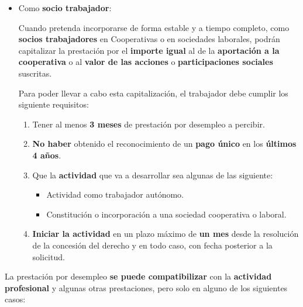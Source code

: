 \begin{enumerate}
\begin{itemize}
        \item Como \textbf{socio trabajador}:

        Cuando pretenda incorporarse de forma estable y a tiempo completo, como \textbf{socios trabajadores} en Cooperativas o en sociedades laborales, podrán capitalizar la prestación por el \textbf{importe igual} al de la \textbf{aportación a la cooperativa} o al \textbf{valor de las acciones} o \textbf{participaciones sociales} suscritas.

        Para poder llevar a cabo esta capitalización, el trabajador debe cumplir los siguiente requisitos:

        \begin{enumerate}
            \item Tener al menos \textbf{3 meses} de prestación por desempleo a percibir.
            \item \textbf{No haber} obtenido el reconocimiento de un \textbf{pago único} en los \textbf{últimos 4 años}.
            \item Que la \textbf{actividad} que va a desarrollar sea algunas de las siguiente:
            \begin{itemize}
                \item Actividad como trabajador autónomo.
                \item Constitución o incorporación a una sociedad cooperativa o laboral.
            \end{itemize}
            \item \textbf{Iniciar la actividad} en un plazo máximo de \textbf{un mes} desde la resolución de la concesión del derecho y en todo caso, con fecha posterior a la solicitud.
        \end{enumerate}
    \end{itemize}
\end{enumerate}

La prestación por desempleo \textbf{se puede compatibilizar} con la \textbf{actividad profesional} y algunas otras prestaciones, pero solo en alguno de los siguientes casos:

